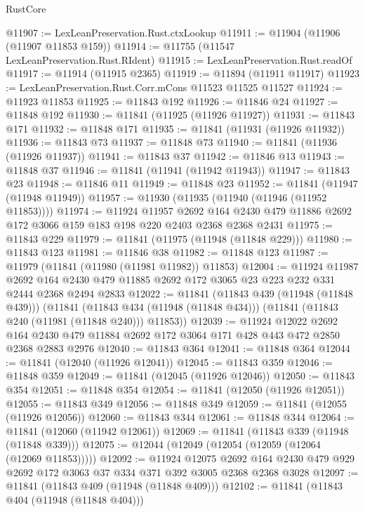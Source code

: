 \begin{lexlean}{RustCore}
\begin{coremodule}
@11907 := LexLeanPreservation.Rust.ctxLookup
@11911 := @11904 (@11906 (@11907 @11853 @159))
@11914 := @11755 (@11547 LexLeanPreservation.Rust.RIdent)
@11915 := LexLeanPreservation.Rust.readOf
@11917 := @11914 (@11915 @2365)
@11919 := @11894 (@11911 @11917)
@11923 := LexLeanPreservation.Rust.Corr.mCons @11523 @11525 @11527
@11924 := @11923 @11853
@11925 := @11843 @192
@11926 := @11846 @24
@11927 := @11848 @192
@11930 := @11841 (@11925 (@11926 @11927))
@11931 := @11843 @171
@11932 := @11848 @171
@11935 := @11841 (@11931 (@11926 @11932))
@11936 := @11843 @73
@11937 := @11848 @73
@11940 := @11841 (@11936 (@11926 @11937))
@11941 := @11843 @37
@11942 := @11846 @13
@11943 := @11848 @37
@11946 := @11841 (@11941 (@11942 @11943))
@11947 := @11843 @23
@11948 := @11846 @11
@11949 := @11848 @23
@11952 := @11841 (@11947 (@11948 @11949))
@11957 := @11930 (@11935 (@11940 (@11946 (@11952 @11853))))
@11974 := @11924
    @11957
    @2692
    @164
    @2430
    @479
    @11886
    @2692
    @172
    @3066
    @159
    @183
    @198
    @220
    @2403
    @2368
    @2368
    @2431
@11975 := @11843 @229
@11979 := @11841 (@11975 (@11948 (@11848 @229)))
@11980 := @11843 @123
@11981 := @11846 @38
@11982 := @11848 @123
@11987 := @11979 (@11841 (@11980 (@11981 @11982)) @11853)
@12004 := @11924
    @11987
    @2692
    @164
    @2430
    @479
    @11885
    @2692
    @172
    @3065
    @23
    @223
    @232
    @331
    @2444
    @2368
    @2494
    @2833
@12022 := @11841
    (@11843 @439 (@11948 (@11848 @439)))
    (@11841
      (@11843 @434 (@11948 (@11848 @434)))
      (@11841 (@11843 @240 (@11981 (@11848 @240))) @11853))
@12039 := @11924
    @12022
    @2692
    @164
    @2430
    @479
    @11884
    @2692
    @172
    @3064
    @171
    @428
    @443
    @472
    @2850
    @2368
    @2883
    @2976
@12040 := @11843 @364
@12041 := @11848 @364
@12044 := @11841 (@12040 (@11926 @12041))
@12045 := @11843 @359
@12046 := @11848 @359
@12049 := @11841 (@12045 (@11926 @12046))
@12050 := @11843 @354
@12051 := @11848 @354
@12054 := @11841 (@12050 (@11926 @12051))
@12055 := @11843 @349
@12056 := @11848 @349
@12059 := @11841 (@12055 (@11926 @12056))
@12060 := @11843 @344
@12061 := @11848 @344
@12064 := @11841 (@12060 (@11942 @12061))
@12069 := @11841 (@11843 @339 (@11948 (@11848 @339)))
@12075 := @12044 (@12049 (@12054 (@12059 (@12064 (@12069 @11853)))))
@12092 := @11924
    @12075
    @2692
    @164
    @2430
    @479
    @929
    @2692
    @172
    @3063
    @37
    @334
    @371
    @392
    @3005
    @2368
    @2368
    @3028
@12097 := @11841 (@11843 @409 (@11948 (@11848 @409)))
@12102 := @11841 (@11843 @404 (@11948 (@11848 @404)))

\end{coremodule}
\end{lexlean}
